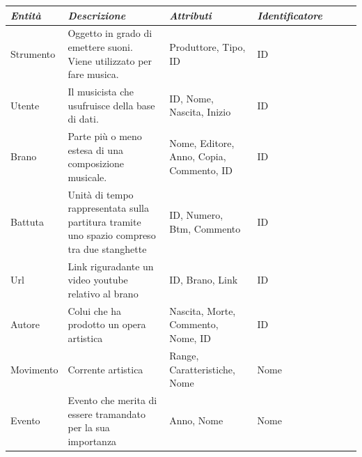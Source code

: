 \documentclass{article}
\begin{document}
    \begin{tabular}{l p{5cm} p{3cm} p{2cm} l l l}
        \toprule
        \textbf{\textit{Entità}} & \textbf{\textit{Descrizione}} & \textbf{\textit{Attributi}} & \textbf{\textit{Identificatore}} \\
        \midrule
        Strumento & Oggetto in grado di emettere suoni. Viene utilizzato per fare musica. & Produttore, \newline Tipo, \newline ID & ID \\
        \midrule
        Utente & Il musicista che usufruisce della base di dati. & ID, \newline Nome, \newline Nascita, \newline Inizio & ID \\
        \midrule
        Brano & Parte più o meno estesa di una composizione musicale. & Nome, \newline Editore, \newline Anno, \newline Copia, \newline Commento, \newline ID & ID \\
        \midrule
        Battuta & Unità di tempo rappresentata sulla partitura tramite uno spazio compreso tra due stanghette & ID, \newline Numero, \newline Btm, \newline Commento & ID \\
        \midrule
        Url & Link riguradante un video youtube relativo al brano & ID, \newline Brano, \newline Link & ID \\
        \midrule
        Autore & Colui che ha prodotto un opera artistica & Nascita, \newline Morte, \newline Commento,  \newline Nome, \newline ID & ID \\
        \midrule
        Movimento & Corrente artistica & Range, \newline Caratteristiche, \newline Nome & Nome \\
        \midrule
        Evento & Evento che merita di essere tramandato per la sua importanza & Anno, \newline Nome & Nome \\
        \bottomrule
    \end{tabular}
\end{document}
